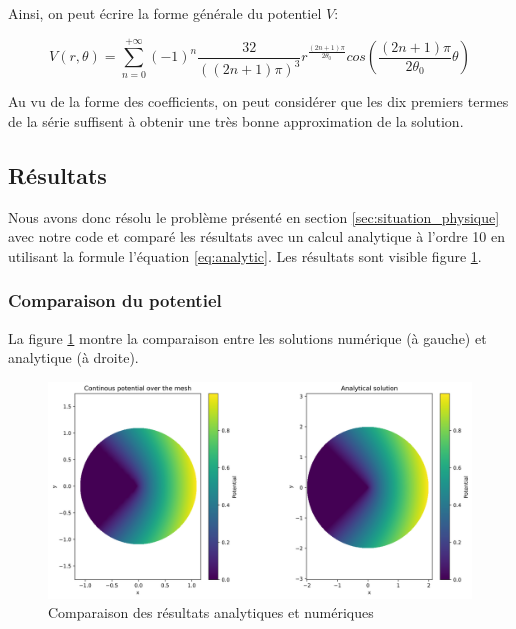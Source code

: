 \documentclass{article}
\begin{document}
Ainsi, on peut écrire la forme générale du potentiel $V$:

\begin{equation}
    V(r, \theta) = \sum_{n=0}^{+\infty}
    \left(-1\right)^n \frac{32}{
        \left((2n+1)\pi\right)^3}
    r^{\frac{(2n+1)\pi}{2 \theta_0}}
    cos\left(\frac{(2n+1)\pi}{2\theta_0}\theta\right)
    \label{eq:analytic}
\end{equation}

Au vu de la forme des coefficients, on peut considérer que 
les dix premiers termes de la série suffisent à obtenir une
très bonne approximation de la solution.

\newpage

\subsection{Résultats}
\label{sec:results}

Nous avons donc résolu le problème présenté en section
\ref{sec:situation_physique} avec notre code et comparé
les résultats avec un calcul analytique à l'ordre 10
en utilisant la formule l'équation \ref{eq:analytic}.
Les résultats sont visible figure \ref{fig:analytic_vs_numeric}.

\subsubsection{Comparaison du potentiel}

La figure \ref{fig:analytic_vs_numeric} montre la comparaison
entre les solutions numérique (à gauche) et analytique (à droite).

\begin{figure}[!h]
    \centering
    \includegraphics[width=\textwidth]{img/comparison.png}
    \caption{Comparaison des résultats analytiques et numériques}
    \label{fig:analytic_vs_numeric}
\end{figure}
\end{document}
